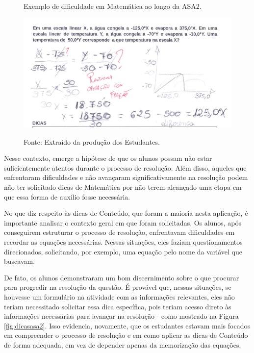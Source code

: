 \begin{figure}[ht]
\begin{center}
\caption{Exemplo de dificuldade em Matemática ao longo da ASA2.}
\includegraphics[width=1\textwidth]{fig/mtmasa2.png}
\label{fig:mtmasa2}
\caption*{Fonte: Extraído da produção dos Estudantes.}
\end{center}
\end{figure}


Nesse contexto, emerge a hipótese de que os alunos possam não estar suficientemente atentos durante o processo de resolução. Além disso, aqueles que enfrentaram dificuldades e não avançaram significativamente na resolução podem não ter solicitado dicas de Matemática por não terem alcançado uma etapa em que essa forma de auxílio fosse necessária.

No que diz respeito às dicas de Conteúdo, que foram a maioria nesta aplicação, é importante analisar o contexto geral em que foram solicitadas. Os alunos, após conseguirem estruturar o processo de resolução, enfrentavam dificuldades em recordar as equações necessárias. Nessas situações, eles faziam questionamentos direcionados, solicitando, por exemplo, uma equação pelo nome da variável que buscavam. 

De fato, os alunos demonstraram um bom discernimento sobre o que procurar para progredir na resolução da questão. É provável que, nessas situações, se houvesse um formulário na atividade com as informações relevantes, eles não teriam necessitado solicitar essa dica específica, pois teriam acesso direto às informações necessárias para avançar na resolução - como mostrado na Figura \ref{fig:dicasasa2}. Isso evidencia, novamente, que os estudantes estavam mais focados em compreender o processo de resolução e em como aplicar as dicas de Conteúdo de forma adequada, em vez de depender apenas da memorização das equações.

